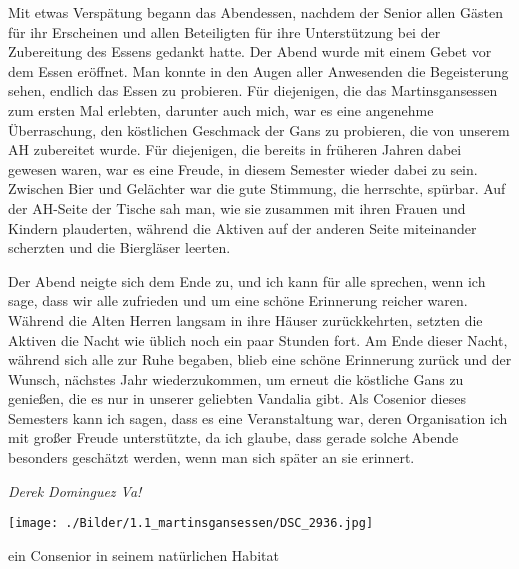 \begin{multicols}{2}
Mit etwas Verspätung begann das Abendessen, nachdem der Senior allen Gästen für ihr Erscheinen und allen Beteiligten für ihre Unterstützung bei der Zubereitung des Essens gedankt hatte. Der Abend wurde mit einem Gebet vor dem Essen eröffnet. Man konnte in den Augen aller Anwesenden die Begeisterung sehen, endlich das Essen zu probieren. Für diejenigen, die das Martinsgansessen zum ersten Mal erlebten, darunter auch mich, war es eine angenehme Überraschung, den köstlichen Geschmack der Gans zu probieren, die von unserem AH zubereitet wurde. Für diejenigen, die bereits in früheren Jahren dabei gewesen waren, war es eine Freude, in diesem Semester wieder dabei zu sein. Zwischen Bier und Gelächter war die gute Stimmung, die herrschte, spürbar. Auf der AH-Seite der Tische sah man, wie sie zusammen mit ihren Frauen und Kindern plauderten, während die Aktiven auf der anderen Seite miteinander scherzten und die Biergläser leerten.

Der Abend neigte sich dem Ende zu, und ich kann für alle sprechen, wenn ich sage, dass wir alle zufrieden und um eine schöne Erinnerung reicher waren. Während die Alten Herren langsam in ihre Häuser zurückkehrten, setzten die Aktiven die Nacht wie üblich noch ein paar Stunden fort. Am Ende dieser Nacht, während sich alle zur Ruhe begaben, blieb eine schöne Erinnerung zurück und der Wunsch, nächstes Jahr wiederzukommen, um erneut die köstliche Gans zu genießen, die es nur in unserer geliebten Vandalia gibt. Als Cosenior dieses Semesters kann ich sagen, dass es eine Veranstaltung war, deren Organisation ich mit großer Freude unterstützte, da ich glaube, dass gerade solche Abende besonders geschätzt werden, wenn man sich später an sie erinnert.
	
	\begin{flushright}
		\hfill\emph{Derek Dominguez Va!}
	\end{flushright}
\end{multicols}
%

%
\begin{figurehere}
	\begin{center}
		\texttt{[image: ./Bilder/1.1\_martinsgansessen/DSC\_2936.jpg]}
		\caption{ein Consenior in seinem natürlichen Habitat} 
	\end{center}
\end{figurehere}
	

%
